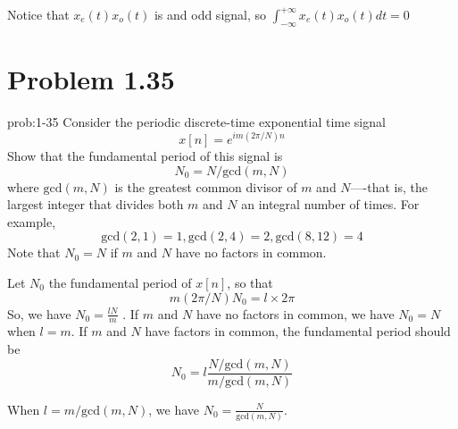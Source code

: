 \documentclass[koma,a4paper,utopia,12pt,listings-color,microtype,paralist,colorlinks,urlcolor=red]{org-article}
\begin{document}
Notice that \(x_{e}(t)x_{o}(t)\) is and odd signal, so \(\int_{-\infty}^{+\infty} x_{e}(t)x_{o}(t) dt = 0\)
\section{Problem 1.35}
\label{sec:orgcf4d953}


\begin{prob}[]{prob:1-35}
Consider the periodic discrete-time exponential time signal
\begin{equation*}
x[n] = e^{im(2\pi/N)n}
\end{equation*}
Show that the fundamental period of this signal is
\begin{equation*}
N_{0} = N / \mathrm{gcd}(m,N)
\end{equation*}
where \(\mathrm{gcd}(m,N)\) is the greatest common divisor of \(m\) and
\(N\)----that is, the largest integer that divides both \(m\) and \(N\) an
integral number of times. For example,
\begin{equation*}
\mathrm{gcd}(2,1) = 1, \mathrm{gcd}(2,4) = 2, \mathrm{gcd}(8,12) = 4
\end{equation*}
Note that \(N_{0} = N\) if \(m\) and \(N\) have no factors in common.
\label{prob:1-35}
\end{prob}

\begin{prf}[]{}
Let \(N_{0}\) the fundamental period of \(x[n]\), so that
\begin{equation*}
m(2\pi / N) N_{0} = l\times 2\pi
\end{equation*}
So, we have \(N_{0} = \frac{lN}{m}\) . If \(m\) and \(N\) have no factors in
common, we have \(N_{0} = N\) when \(l = m\). If \(m\) and \(N\) have factors in
common, the fundamental period should be
\begin{equation*}
N_{0} = l \frac{N/ \mathrm{gcd}(m,N) }{m/ \mathrm{gcd}(m,N)}
\end{equation*}

When \(l = m/ \mathrm{gcd}(m,N)\), we have \(N_{0} = \frac{N}{ \mathrm{gcd}(m,N) }\).
\end{prf}
\end{document}
